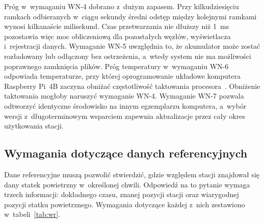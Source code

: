 Próg w~wymaganiu WN-4 dobrano z~dużym zapasem. Przy kilkudziesięciu ramkach odbieranych w~ciągu sekundy średni odstęp między kolejnymi ramkami wynosi kilkanaście milisekund. Czas przetwarzania nie dłuższy niż \SI{1}{ms} pozostawia więc moc obliczeniową dla pozostałych węzłów, wyświetlacza i~rejestracji danych. Wymaganie WN-5 uwzględnia to, że akumulator może zostać rozładowany lub odłączony bez ostrzeżenia, a~wtedy system nie ma możliwości poprawnego zamknięcia plików. Próg temperatury w~wymaganiu WN-6 odpowiada temperaturze, przy której oprogramowanie układowe komputera Raspberry Pi~4B zaczyna obniżać częstotliwość taktowania procesora~\cite{rpi_thermal}. Obniżenie taktowania mogłoby naruszyć wymaganie WN-4. Wymaganie WN-7 pozwala odtworzyć identyczne środowisko na innym egzemplarzu komputera, a~wybór wersji z~długoterminowym wsparciem zapewnia aktualizacje przez cały okres użytkowania stacji.

\subsection{Wymagania dotyczące danych referencyjnych}
\label{sec:wymagania_referencja}

Dane referencyjne muszą pozwolić stwierdzić, gdzie względem stacji znajdował się dany statek powietrzny w~określonej chwili. Odpowiedź na to pytanie wymaga trzech informacji: dokładnego czasu, znanej pozycji stacji oraz wiarygodnej pozycji statku powietrznego. Wymagania dotyczące każdej z~nich zestawiono w~tabeli~\ref{tab:wr}.

